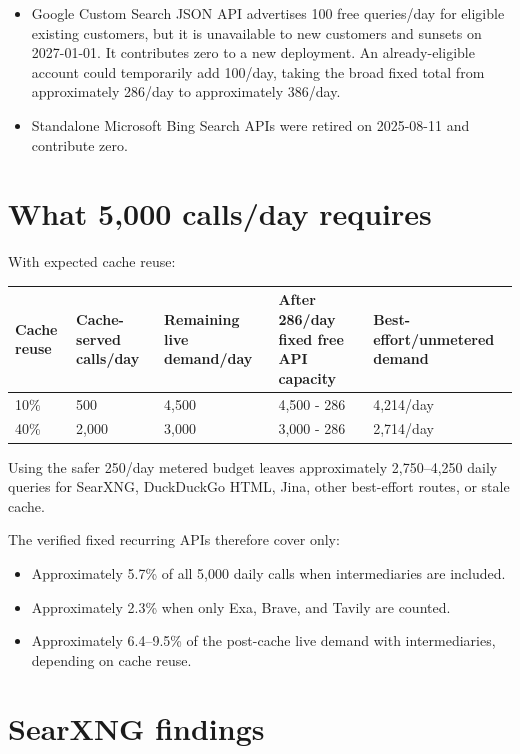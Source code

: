 \documentclass[11pt]{article}
\begin{document}
\begin{itemize}
\item Google Custom Search JSON API advertises 100 free queries/day for eligible
existing customers, but it is unavailable to new customers and sunsets on
2027-01-01.  It contributes zero to a new deployment.  An already-eligible
account could temporarily add 100/day, taking the broad fixed total from
approximately 286/day to approximately 386/day.
\item Standalone Microsoft Bing Search APIs were retired on 2025-08-11 and
contribute zero.
\end{itemize}
\section*{What 5,000 calls/day requires}
\label{sec:orgb7bbb59}

With expected cache reuse:

\begin{center}
\begin{tabular}{lllll}
Cache reuse & Cache-served calls/day & Remaining live demand/day & After 286/day fixed free API capacity & Best-effort/unmetered demand\\
\hline
10\% & 500 & 4,500 & 4,500 - 286 & 4,214/day\\
40\% & 2,000 & 3,000 & 3,000 - 286 & 2,714/day\\
\end{tabular}
\end{center}

Using the safer 250/day metered budget leaves approximately 2,750--4,250 daily
queries for SearXNG, DuckDuckGo HTML, Jina, other best-effort routes, or stale
cache.

The verified fixed recurring APIs therefore cover only:

\begin{itemize}
\item Approximately 5.7\% of all 5,000 daily calls when intermediaries are included.
\item Approximately 2.3\% when only Exa, Brave, and Tavily are counted.
\item Approximately 6.4--9.5\% of the post-cache live demand with intermediaries,
depending on cache reuse.
\end{itemize}
\section*{SearXNG findings}
\label{sec:orgd6a79ee}
\end{document}
